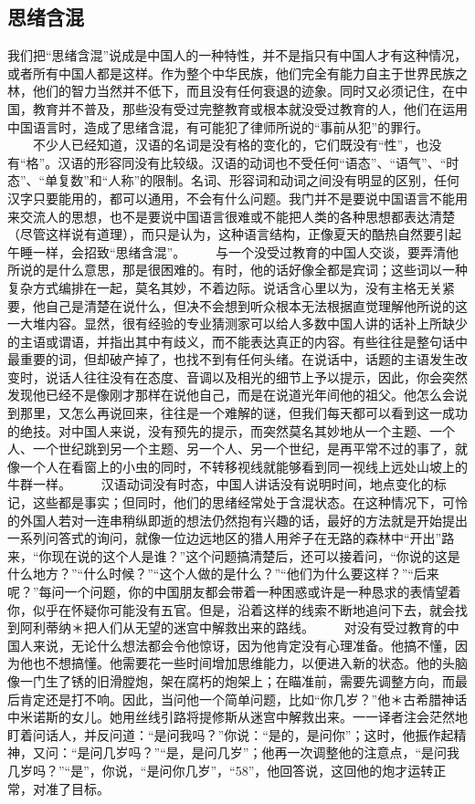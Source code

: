 \documentclass[12pt,oneside]{book}
\begin{document}
\begin{common-format}
\chapter{思绪含混}
我们把“思绪含混”说成是中国人的一种特性，并不是指只有中国人才有这种情况，或者所有中国人都是这样。作为整个中华民族，他们完全有能力自主于世界民族之林，他们的智力当然并不低下，而且没有任何衰退的迹象。同时又必须记住，在中国，教育并不普及，那些没有受过完整教育或根本就没受过教育的人，他们在运用中国语言时，造成了思绪含混，有可能犯了律师所说的“事前从犯”的罪行。 
　　不少人已经知道，汉语的名词是没有格的变化的，它们既没有“性”，也没有“格”。汉语的形容同没有比较级。汉语的动词也不受任何“语态”、“语气”、“时态”、“单复数”和“人称”的限制。名词、形容词和动词之间没有明显的区别，任何汉字只要能用的，都可以通用，不会有什么问题。我门并不是要说中国语言不能用来交流人的思想，也不是要说中国语言很难或不能把人类的各种思想都表达清楚（尽管这样说有道理），而只是认为，这种语言结构，正像夏天的酷热自然要引起午睡一样，会招致“思绪含混”。 
　　与一个没受过教育的中国人交谈，要弄清他所说的是什么意思，那是很困难的。有时，他的话好像全都是宾词；这些词以一种复杂方式编排在一起，莫名其妙，不着边际。说话含心里以为，没有主格无关紧要，他自己是清楚在说什么，但决不会想到听众根本无法根据直觉理解他所说的这一大堆内容。显然，很有经验的专业猜测家可以给人多数中国人讲的话补上所缺少的主语或谓语，并指出其中有歧义，而不能表达真正的内容。有些往往是整句话中最重要的词，但却破产掉了，也找不到有任何头绪。在说话中，话题的主语发生改变时，说话人往往没有在态度、音调以及相光的细节上予以提示，因此，你会突然发现他已经不是像刚才那样在说他自己，而是在说道光年间他的祖父。他怎么会说到那里，又怎么再说回来，往往是一个难解的谜，但我们每天都可以看到这一成功的绝技。对中国人来说，没有预先的提示，而突然莫名其妙地从一个主题、一个人、一个世纪跳到另一个主题、另一个人、另一个世纪，是再平常不过的事了，就像一个人在看窗上的小虫的同时，不转移视线就能够看到同一视线上远处山坡上的牛群一样。 
　　汉语动词没有时态，中国人讲话没有说明时间，地点变化的标记，这些都是事实；但同时，他们的思绪经常处于含混状态。在这种情况下，可怜的外国人若对一连串稍纵即逝的想法仍然抱有兴趣的话，最好的方法就是开始提出一系列问答式的询问，就像一位边远地区的猎人用斧子在无路的森林中“开出”路来，“你现在说的这个人是谁？”这个问题搞清楚后，还可以接着问，“你说的这是什么地方？”“什么时候？”“这个人做的是什么？”“他们为什么要这样？”“后来呢？”每问一个问题，你的中国朋友都会带着一种困惑或许是一种恳求的表情望着你，似乎在怀疑你可能没有五官。但是，沿着这样的线索不断地追问下去，就会找到阿利蒂纳＊把人们从无望的迷宫中解救出来的路线。 
　　对没有受过教育的中国人来说，无论什么想法都会令他惊讶，因为他肯定没有心理准备。他搞不懂，因为他也不想搞懂。他需要花一些时间增加思维能力，以便进入新的状态。他的头脑像一门生了锈的旧滑膛炮，架在腐朽的炮架上；在瞄准前，需要先调整方向，而最后肯定还是打不响。因此，当问他一个简单问题，比如“你几岁？”他＊古希腊神话中米诺斯的女儿。她用丝线引路将提修斯从迷宫中解救出来。一一译者注会茫然地盯着问话人，并反问道：“是问我吗？”你说：“是的，是问你”；这时，他振作起精神，又问：“是问几岁吗？”“是，是问几岁”；他再一次调整他的注意点，“是问我几岁吗？”“是”，你说，“是问你几岁”，“58”，他回答说，这回他的炮才运转正常，对准了目标。 

\end{common-format}
\end{document}
